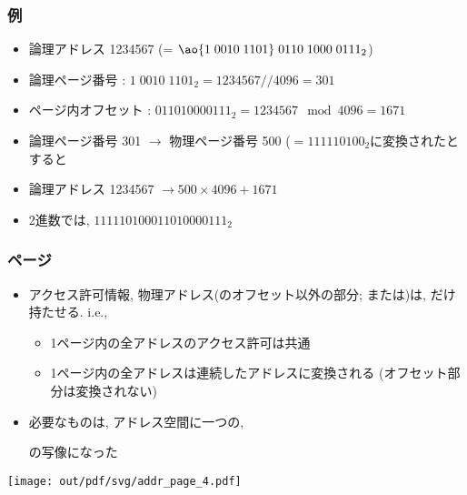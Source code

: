 \documentclass[12pt,dvipdfmx]{beamer}
\begin{document}
\begin{frame}
  \frametitle{例}
  \begin{itemize}
  \item 論理アドレス 1234567 (= $\ao{1\; 0010\; 1101}\; 0110\; 1000\; 0111_2$)
    
  \item 論理ページ番号 : $1\; 0010\; 1101_2 = 1234567 // 4096 = 301$ 
  \item ページ内オフセット :  $0110 1000 0111_2 = 1234567 \mod 4096 = 1671$
    
  \item 論理ページ番号 301 $\rightarrow$ 物理ページ番号 500 ($= 1 1111 0100_2$に変換されたとすると
    
  \item 論理アドレス 1234567 $\rightarrow 500 \times 4096 + 1671$
    
  \item 2進数では, $1 1111 0100 0110 1000 0111_2$
  \end{itemize}
\end{frame}


\begin{frame}
  \frametitle{ページ}
  \begin{itemize}
  \item アクセス許可情報, 物理アドレス(のオフセット以外の部分;
    または)は,
    だけ持たせる. i.e.,
    \begin{itemize}
    \item 1ページ内の全アドレスのアクセス許可は共通
    \item 1ページ内の全アドレスは連続したアドレスに変換される
      (オフセット部分は変換されない)
    \end{itemize}
    
  \item 必要なものは, アドレス空間に一つの,
    \begin{center}
    \end{center}
    の写像になった
  \end{itemize}
  \begin{center}
    \texttt{[image: out/pdf/svg/addr\_page\_4.pdf]}
  \end{center}
\end{frame}
\end{document}
